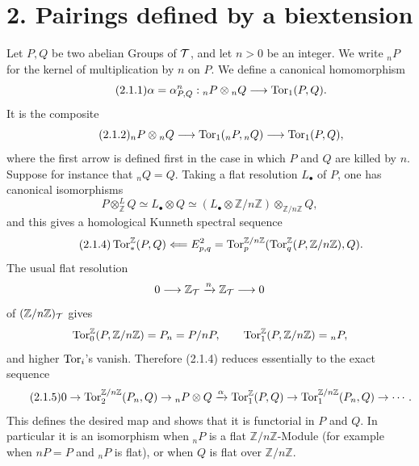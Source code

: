\documentclass[11pt]{article}
\begin{document}
\section*{2. Pairings defined by a biextension}

Let \(P,Q\) be two abelian Groups of \(\mathcal T\), and let \(n>0\) be an integer.  We write \({}_nP\) for the kernel of multiplication by \(n\) on \(P\).  We define a canonical homomorphism
\begin{equation}\tag{2.1.1}
        \alpha=\alpha^n_{P,Q}:{}_nP\otimes{}_nQ\longrightarrow \operatorname{Tor}_1(P,Q).
\end{equation}
It is the composite
\begin{equation}\tag{2.1.2}
        {}_nP\otimes{}_nQ
        \longrightarrow \operatorname{Tor}_1({}_nP,{}_{n}Q)
        \longrightarrow \operatorname{Tor}_1(P,Q),
\end{equation}
where the first arrow is defined first in the case in which \(P\) and \(Q\) are killed by \(n\).  Suppose for instance that \({}_nQ=Q\).  Taking a flat resolution \(L_\bullet\) of \(P\), one has canonical isomorphisms
\[
        P\otimes^L_{\mathbb Z}Q
        \simeq L_\bullet\otimes Q
        \simeq (L_\bullet\otimes \mathbb Z/n\mathbb Z)\otimes_{\mathbb Z/n\mathbb Z}Q,
\]
and this gives a homological Kunneth spectral sequence
\begin{equation}\tag{2.1.4}
        \operatorname{Tor}_*^{\mathbb Z}(P,Q)
        \Longleftarrow
        E^2_{p,q}=\operatorname{Tor}_p^{\mathbb Z/n\mathbb Z}
        (\operatorname{Tor}_q^{\mathbb Z}(P,\mathbb Z/n\mathbb Z),Q).
\end{equation}
The usual flat resolution
\[
        0\longrightarrow\mathbb Z_\mathcal T\xrightarrow{n}\mathbb Z_\mathcal T\longrightarrow0
\]
of \((\mathbb Z/n\mathbb Z)_\mathcal T\) gives
\[
        \operatorname{Tor}_0^{\mathbb Z}(P,\mathbb Z/n\mathbb Z)=P_n=P/nP,
        \qquad
        \operatorname{Tor}_1^{\mathbb Z}(P,\mathbb Z/n\mathbb Z)={}_nP,
\]
and higher \(\operatorname{Tor}_i\)'s vanish.  Therefore (2.1.4) reduces essentially to the exact sequence
\begin{equation}\tag{2.1.5}
0\to \operatorname{Tor}_2^{\mathbb Z/n\mathbb Z}(P_n,Q)\to {}_nP\otimes Q
\xrightarrow{\alpha}\operatorname{Tor}_1^{\mathbb Z}(P,Q)\to\operatorname{Tor}_1^{\mathbb Z/n\mathbb Z}(P_n,Q)\to\cdots .
\end{equation}
This defines the desired map and shows that it is functorial in \(P\) and \(Q\).  In particular it is an isomorphism when \({}_nP\) is a flat \(\mathbb Z/n\mathbb Z\)-Module (for example when \(nP=P\) and \({}_nP\) is flat), or when \(Q\) is flat over \(\mathbb Z/n\mathbb Z\).
\end{document}
